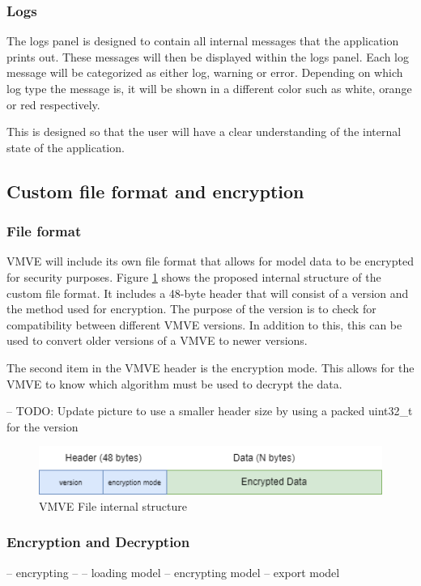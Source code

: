 \documentclass[11pt]{article}
\begin{document}
\subsubsection{Logs}
The logs panel is designed to contain all internal messages that the application
prints out. These messages will then be displayed within the logs panel. Each
log message will be categorized as either log, warning or error. Depending on
which log type the message is, it will be shown in a different color such as
white, orange or red respectively.

This is designed so that the user will have a clear understanding of the internal state
of the application.

\subsection{Custom file format and encryption}

\subsubsection{File format}
VMVE will include its own file format that allows for model data to be encrypted for security purposes.
Figure \ref{fig:vmve_file_structure} shows the proposed internal structure of the custom file format.
It includes a 48-byte header that will consist of a version and the method used for encryption.
The purpose of the version is to check for compatibility between different VMVE versions. In addition to this,
this can be used to convert older versions of a VMVE to newer versions.

The second item in the VMVE header is the encryption mode. This allows for the VMVE to know which algorithm
must be used to decrypt the data.

-- TODO: Update picture to use a smaller header size by using a packed uint32\_t for the version

\begin{figure}[ht]
  \centering
  \includegraphics[width=\textwidth]{images/vmve_file_structure.png}
  \caption{VMVE File internal structure}
  \label{fig:vmve_file_structure}
\end{figure}


\subsubsection{Encryption and Decryption}
-- encrypting --
-- loading model
-- encrypting model
-- export model
\end{document}
